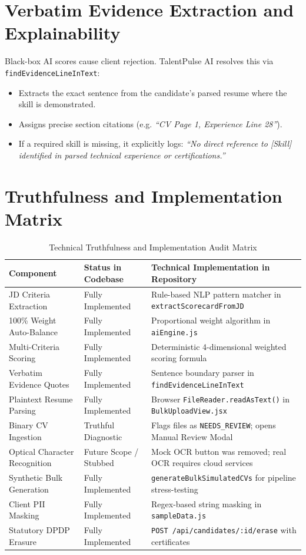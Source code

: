 \documentclass[11pt,a4paper,oneside]{report}
\begin{document}
\section{Verbatim Evidence Extraction and Explainability}
Black-box AI scores cause client rejection. TalentPulse AI resolves this via \texttt{findEvidenceLineInText}:
\begin{itemize}[leftmargin=1.5em]
    \item Extracts the exact sentence from the candidate's parsed resume where the skill is demonstrated.
    \item Assigns precise section citations (e.g. \textit{``CV Page 1, Experience Line 28''}).
    \item If a required skill is missing, it explicitly logs: \textit{``No direct reference to [Skill] identified in parsed technical experience or certifications.''}
\end{itemize}

\section{Truthfulness and Implementation Matrix}
\begin{table}[H]
\centering
\small
\renewcommand{\arraystretch}{1.2}
\begin{tabularx}{\textwidth}{@{} p{4.2cm} p{2.8cm} X @{}}
    \toprule
    \textbf{Component} & \textbf{Status in Codebase} & \textbf{Technical Implementation in Repository} \\
    \midrule
    JD Criteria Extraction & Fully Implemented & Rule-based NLP pattern matcher in \texttt{extractScorecardFromJD} \\
    100\% Weight Auto-Balance & Fully Implemented & Proportional weight algorithm in \texttt{aiEngine.js} \\
    Multi-Criteria Scoring & Fully Implemented & Deterministic 4-dimensional weighted scoring formula \\
    Verbatim Evidence Quotes & Fully Implemented & Sentence boundary parser in \texttt{findEvidenceLineInText} \\
    Plaintext Resume Parsing & Fully Implemented & Browser \texttt{FileReader.readAsText()} in \texttt{BulkUploadView.jsx} \\
    Binary CV Ingestion & Truthful Diagnostic & Flags files as \texttt{NEEDS\_REVIEW}; opens Manual Review Modal \\
    Optical Character Recognition & Future Scope / Stubbed & Mock OCR button was removed; real OCR requires cloud services \\
    Synthetic Bulk Generation & Fully Implemented & \texttt{generateBulkSimulatedCVs} for pipeline stress-testing \\
    Client PII Masking & Fully Implemented & Regex-based string masking in \texttt{sampleData.js} \\
    Statutory DPDP Erasure & Fully Implemented & \texttt{POST /api/candidates/:id/erase} with certificates \\
    \bottomrule
\end{tabularx}
\caption{Technical Truthfulness and Implementation Audit Matrix}
\end{table}
\end{document}
